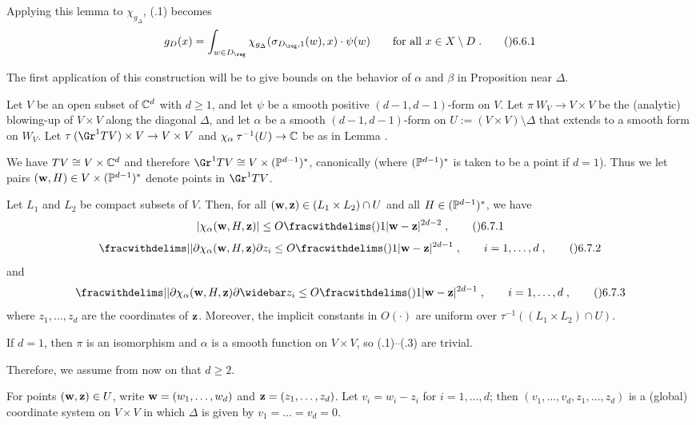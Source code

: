   Applying this lemma to $\chi_{g_\Delta}$, (.1) becomes
$$g_D(x)
  = \int_{w\in D_\reg} \chi_{g_\Delta}(\sigma_{D_\reg,1}(w),x)\cdot\psi(w)
  \qquad\text{for all $x\in X\setminus D$}\;.\tag\06.6.1$$
\endit

The first application of this construction will be to give bounds on the
behavior of $\alpha$ and $\beta$ in Proposition  near $\Delta$.

  Let $V$ be an open subset of $\Bbb C^d$ with $d\ge1$, and
let $\psi$ be a smooth positive $(d-1,d-1)$\snug-form on $V$.
Let $\pi\:W_V\to V\times V$ be the (analytic) blowing-up of $V\times V$
along the diagonal $\Delta$, and
let $\alpha$ be a smooth $(d-1,d-1)$\snug-form
on $U := (V\times V)\setminus\Delta$ that extends to a smooth form on $W_V$.
Let $\tau\:(\Gr^1 TV)\times V\to V\times V$
and $\chi_\alpha\:\tau^{-1}(U)\to\Bbb C$ be as in Lemma .

We have $TV\cong V\times\Bbb C^d$ and therefore
$\Gr^1 TV\cong V\times(\Bbb P^{d-1})^{*}$, canonically
(where $(\Bbb P^{d-1})^{*}$ is taken to be a point if $d=1$).
Thus we let pairs $(\bold w,H)\in V\times(\Bbb P^{d-1})^{*}$ denote
points in $\Gr^1 TV$.

Let $L_1$ and $L_2$ be compact subsets of $V$.
Then, for all $(\bold w,\bold z)\in (L_1\times L_2)\cap U$
and all $H\in(\Bbb P^{d-1})^{*}$, we have
$$|\chi_\alpha(\bold w,H,\bold z)|
  \le O\fracwithdelims()1{|\bold w-\bold z|^{2d-2}}\;, \tag\06.7.1$$
$$\fracwithdelims||{\partial\chi_\alpha(\bold w,H,\bold z)}{\partial z_i}
  \le O\fracwithdelims()1{|\bold w-\bold z|^{2d-1}}\;,
  \qquad i=1,\dots,d\;,\tag\06.7.2$$
and
$$\fracwithdelims||{\partial\chi_\alpha(\bold w,H,\bold z)}
    {\partial\widebar z_i}
  \le O\fracwithdelims()1{|\bold w-\bold z|^{2d-1}}\;,
  \qquad i=1,\dots,d\;,\tag\06.7.3$$
where $z_1,\dots,z_d$ are the coordinates of $\bold z$.
Moreover, the implicit constants in $O(\cdot)$ are uniform
over $\tau^{-1}((L_1\times L_2)\cap U)$.
\endit

  If $d=1$, then $\pi$ is an isomorphism and $\alpha$ is a smooth
function on $V\times V$, so (.1)--(.3) are trivial.

Therefore, we assume from now on that $d\ge2$.

For points $(\bold w,\bold z)\in U$,
write $\bold w=(w_1,\dots,w_d)$ and $\bold z=(z_1,\dots,z_d)$.
Let $v_i=w_i-z_i$ for $i=1,\dots,d$; then $(v_1,\dots,v_d,z_1,\dots,z_d)$
is a (global) coordinate system on $V\times V$
in which $\Delta$ is given by $v_1=\dots=v_d=0$.

